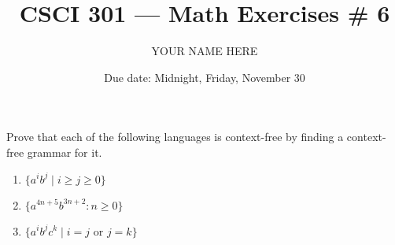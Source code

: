 \documentclass{article}
\title{CSCI 301 --- Math Exercises \# 6}
\author{YOUR NAME HERE}
\date{Due date:  Midnight, Friday, November 30}
\begin{document}
\maketitle

\noindent
Prove that each of the following languages
is context-free by finding a context-free
grammar for it.

\begin{enumerate}
\item
  $\{a^ib^j\mid i \geq j \geq 0\}$

\item
  $\{a^{4n+5}b^{3n+2}: n\geq 0\}$

\item
  $\{a^ib^jc^k \mid i = j \mbox{ or } j = k\}$


\end{enumerate}
\end{document}
